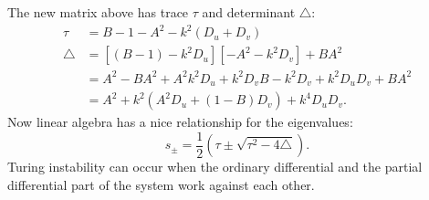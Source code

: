 The new matrix above has trace $\tau$ and determinant $\triangle$:
\begin{align}
\tau &= B - 1 - A^2 - k^2(D_u + D_v) \\
\triangle &= [(B-1) - k^2 D_u ][-A^2 - k^2D_v] + BA^2 \\
		  &= A^2 - BA^2 + A^2k^2D_u + k^2D_vB - k^2 D_v + k^2 D_u D_v + BA^2 \\
		  &= A^2 + k^2(A^2 D_u + (1 - B)D_v ) + k^4 D_u D_v.
\end{align}
Now linear algebra has a nice relationship for the eigenvalues:
\begin{equation}
s_\pm = \frac{1}{2}(\tau \pm \sqrt{\tau^2 - 4\triangle}).
\end{equation}
Turing instability can occur when the ordinary differential and the partial differential part of the system work against each other. 



